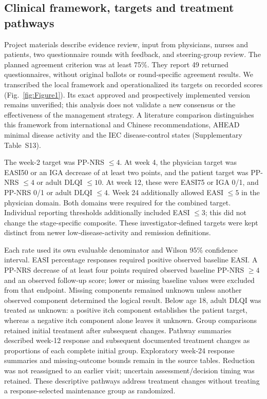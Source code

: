 \documentclass[10pt,a4paper]{article}
\begin{document}
\subsection{Clinical framework, targets and treatment pathways}
Project materials describe evidence review, input from physicians, nurses and patients, two questionnaire rounds with feedback, and steering-group review. The planned agreement criterion was at least 75\%. They report 49 returned questionnaires, without original ballots or round-specific agreement results. We transcribed the local framework and operationalized its targets on recorded scores (Fig.~\ref{fig:Figure1}). Its exact approved and prospectively implemented version remains unverified; this analysis does not validate a new consensus or the effectiveness of the management strategy. A literature comparison distinguishes this framework from international and Chinese recommendations, AHEAD minimal disease activity and the IEC disease-control states (Supplementary Table~S13).\citep{debruin2021t2t,zhao2022chinat2t,yeung2023t2t,silverberg2024ahead,merola2026iec}

The week-2 target was PP-NRS $\leq4$. At week 4, the physician target was EASI50 or an IGA decrease of at least two points, and the patient target was PP-NRS $\leq4$ or adult DLQI $\leq10$. At week 12, these were EASI75 or IGA 0/1, and PP-NRS 0/1 or adult DLQI $\leq4$. Week 24 additionally allowed EASI $\leq5$ in the physician domain. Both domains were required for the combined target. Individual reporting thresholds additionally included EASI $\leq3$; this did not change the stage-specific composite. These investigator-defined targets were kept distinct from newer low-disease-activity and remission definitions.\citep{merola2026iec}

Each rate used its own evaluable denominator and Wilson 95\% confidence interval. EASI percentage responses required positive observed baseline EASI. A PP-NRS decrease of at least four points required observed baseline PP-NRS $\geq4$ and an observed follow-up score; lower or missing baseline values were excluded from that endpoint. Missing components remained unknown unless another observed component determined the logical result. Below age 18, adult DLQI was treated as unknown: a positive itch component establishes the patient target, whereas a negative itch component alone leaves it unknown. Group comparisons retained initial treatment after subsequent changes. Pathway summaries described week-12 response and subsequent documented treatment changes as proportions of each complete initial group. Exploratory week-24 response summaries and missing-outcome bounds remain in the source tables. Reduction was not reassigned to an earlier visit; uncertain assessment/decision timing was retained. These descriptive pathways address treatment changes without treating a response-selected maintenance group as randomized.\citep{iche9r1}
\end{document}
